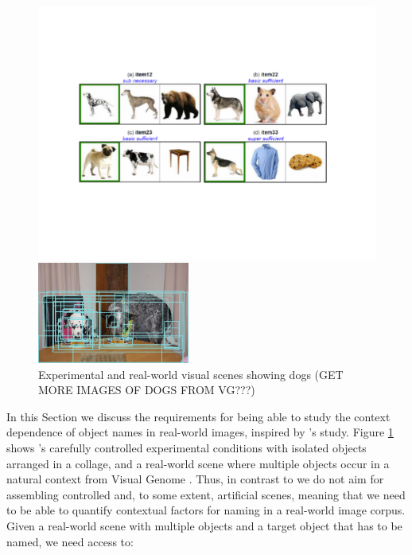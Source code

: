 \documentclass[runningheads]{llncs}
\begin{document}
\begin{figure}[t]
	\begin{center}
		\begin{minipage}{.52\textwidth}
			\includegraphics[width=\linewidth]{fig/graffig.pdf}
		\end{minipage}
		\begin{minipage}{.42\textwidth}
			\includegraphics[width=5cm]{fig/visual_genome_dogs.png}
		\end{minipage}
	\end{center}
	\caption{Experimental and real-world visual scenes showing dogs (GET MORE IMAGES OF DOGS FROM VG???)}
	\label{fig:graf_genome}
\end{figure}

In this Section we discuss the requirements for  being able to study the context dependence of object names in real-world images, inspired by \cite{graf2016animal}'s study.
 Figure \ref{fig:graf_genome} shows  \cite{graf2016animal}'s carefully controlled experimental conditions with isolated objects arranged in a collage, and a real-world scene where multiple objects occur in a natural context from Visual Genome \cite{krishna2016visualgenome}.
Thus, in contrast to \cite{graf2016animal} we do not aim for assembling controlled and, to some extent, artificial scenes, meaning that we need to be able to quantify contextual factors for naming in a real-world image corpus. 
Given a real-world scene with multiple objects and a target object that has to be named, we need access to:
\end{document}
